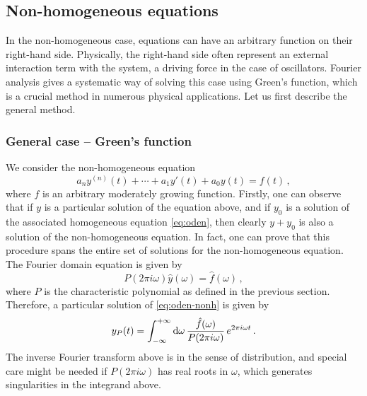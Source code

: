 \subsection{Non-homogeneous equations}
In the non-homogeneous case, equations can have an arbitrary function on their right-hand
side. Physically, the right-hand side often represent an external interaction term with
the system, \eg a driving force in the case of oscillators. Fourier analysis gives a
systematic way of solving this case using Green's function, which is a crucial method in
numerous physical applications. Let us first describe the general method.
\subsubsection{General case -- Green's function}
We consider the non-homogeneous equation
\begin{equation}
  a_ny^{(n)}(t)+\cdots+a_1y'(t)+a_0y(t)=f(t)\,,\label{eq:oden-nonh}
\end{equation}
where $f$ is an arbitrary moderately growing function. Firstly, one can observe that if
$y$ is a particular solution of the equation above, and if $y_0$ is a solution of the
associated homogeneous equation \cref{eq:oden}, then clearly $y+y_0$ is also a solution of
the non-homogeneous equation. In fact, one can prove that this procedure spans the entire
set of solutions for the non-homogeneous equation. The Fourier domain equation is given by
\begin{equation}
  P(2\pi i\omega)\hat{y}(\omega)=\hat{f}(\omega)\,,
\end{equation}
where $P$ is the characteristic polynomial as defined in the previous section. Therefore,
a particular solution of \cref{eq:oden-nonh} is given by
\begin{equation}
  y_P(t)=\int_{-\infty}^{+\infty}\mathrm{d}{\omega}\,\frac{\hat{f}(\omega)}{P(2\pi i\omega)}\,e^{2\pi i \omega t}\,.
  \label{eq:oden-part}
\end{equation}
The inverse Fourier transform above is in the sense of distribution, and special care
might be needed if $P(2\pi i\omega)$ has real roots in $\omega$, which generates
singularities in the integrand above.

